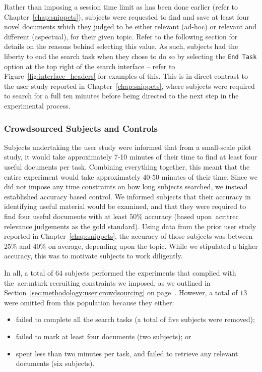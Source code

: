 Rather than imposing a session time limit as has been done earlier (refer to Chapter~\ref{chap:snippets}), subjects were requested to find and save at least four novel documents which they judged to be either relevant (ad-hoc) or relevant and different (aspectual), for their given topic. Refer to the following section for details on the reasons behind selecting this value. As such, subjects had the liberty to end the search task when they chose to do so by selecting the \texttt{End Task} option at the top right of the search interface -- refer to Figure~\ref{fig:interface_headers} for examples of this. This is in direct contrast to the user study reported in Chapter~\ref{chap:snippets}, where subjects were required to search for a full ten minutes before being directed to the next step in the experimental process.

\subsubsection{Crowdsourced Subjects and Controls}
Subjects undertaking the user study were informed that from a small-scale pilot study, it would take approximately 7-10 minutes of their time to find at least four useful documents per task. Combining everything together, this meant that the entire experiment would take approximately 40-50 minutes of their time. Since we did not impose any time constraints on how long subjects searched, we instead established accuracy based control. We informed subjects that their accuracy in identifying useful material would be examined, and that they were required to find four useful documents with at least $50\%$ accuracy (based upon~\gls{acr:trec} relevance judgements as the gold standard). Using data from the prior user study reported in Chapter~\ref{chap:snippets}, the accuracy of those subjects was between $25\%$ and $40\%$ on average, depending upon the topic. While we stipulated a higher accuracy, this was to motivate subjects to work diligently.

In all, a total of $64$ subjects performed the experiments that complied with the~\gls{acr:mturk} recruiting constraints we imposed, as we outlined in Section~\ref{sec:methodology:user:crowdsourcing} on page~\pageref{sec:methodology:user:crowdsourcing}. However, a total of $13$ were omitted from this population because they either:

\begin{itemize}
    \item{failed to complete all the search tasks (a total of five subjects were removed);}
    \item{failed to mark at least four documents (two subjects); or}
    \item{spent less than two minutes per task, and failed to retrieve any relevant documents (six subjects).}
\end{itemize}


